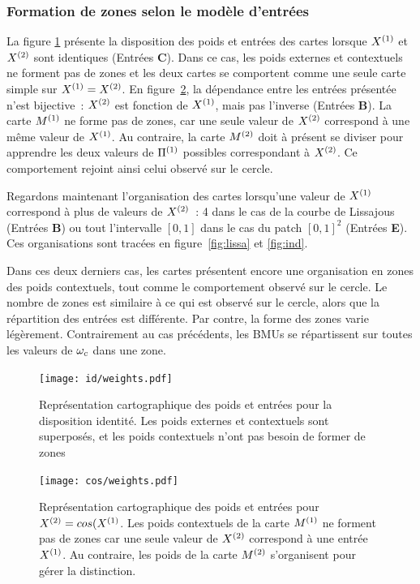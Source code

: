 \documentclass[../main]{subfiles}
\begin{document}
\subsubsection{Formation de zones selon le modèle d'entrées}

La figure \ref{fig:id_results} présente la disposition des poids et entrées des cartes lorsque $X^{({1})}$ et $X^{({2})}$ sont identiques (Entrées \textbf{C}).
Dans ce cas, les poids externes et contextuels ne forment pas de zones et les deux cartes se comportent comme une seule carte simple sur $X^{({1})} = X^{({2})}$. 
En figure~\ref{fig:cos_results}, la dépendance entre les entrées présentée n'est bijective~: $X^{({2})}$ est fonction de $X^{({1})}$, mais pas l'inverse (Entrées \textbf{B}). 
La carte $M^{({1})}$ ne forme pas de zones, car une seule valeur de $X^{({2})}$ correspond à une même valeur de $X^{({1})}$.
Au contraire, la carte $M^{({2})}$ doit à présent se diviser pour apprendre les deux valeurs de $\Pi^{({1})}$ possibles correspondant à $X^{({2})}$. 
Ce comportement rejoint ainsi celui observé sur le cercle.

Regardons maintenant l'organisation des cartes lorsqu'une valeur de $X^{({1})}$ correspond à plus de valeurs de $X^{({2})}$~: 4 dans le cas de la courbe de Lissajous (Entrées \textbf{B}) ou tout l'intervalle $[0,1]$ dans le cas du patch $[0,1]^2$ (Entrées \textbf{E}). Ces organisations sont tracées en figure~\ref{fig:lissa} et \ref{fig:ind}.



Dans ces deux derniers cas, les cartes présentent encore une organisation en zones des poids contextuels, tout comme le comportement observé sur le cercle. 
Le nombre de zones est similaire à ce qui est observé sur le cercle, alors que la répartition des entrées est différente. Par contre, la forme des zones varie légèrement.
Contrairement au cas précédents, les BMUs se répartissent sur toutes les valeurs de $\omega_c$ dans une zone.

\begin{figure}[H]
	\centering\texttt{[image: id/weights.pdf]}
	\vspace{-0.7cm}
	\caption{Représentation cartographique des poids et entrées pour la disposition identité. Les poids externes et contextuels sont superposés, et les poids contextuels n'ont pas besoin de former de zones \label{fig:id_results}}
\end{figure}

	\begin{figure}[H]
		\centering\texttt{[image: cos/weights.pdf]}
		\vspace{-0.5cm}
		\caption{Représentation cartographique des poids et entrées pour $X^{({2})} = cos(X^{({1})}$. Les poids contextuels de la carte $M^{({1})}$ ne forment pas de zones car une seule valeur de $X^{({2})}$ correspond à une entrée $X^{({1})}$. Au contraire, les poids de la carte $M^{({2})}$ s'organisent pour gérer la distinction. \label{fig:cos_results}}
	\end{figure}
	
\end{document}
